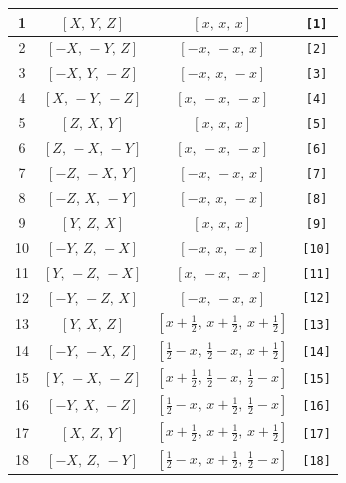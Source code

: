 \documentclass[fleqn,8pt]{jsarticle}
\begin{document}
\begin{longtable}{cccc}
1 & $\left[ X,\, Y,\, Z \right]$ & $\left[ x,\, x,\, x \right]$ & {\tt [1]} \\ \hline
2 & $\left[ - X,\, - Y,\, Z \right]$ & $\left[ - x,\, - x,\, x \right]$ & {\tt [2]} \\ \hline
3 & $\left[ - X,\, Y,\, - Z \right]$ & $\left[ - x,\, x,\, - x \right]$ & {\tt [3]} \\ \hline
4 & $\left[ X,\, - Y,\, - Z \right]$ & $\left[ x,\, - x,\, - x \right]$ & {\tt [4]} \\ \hline
5 & $\left[ Z,\, X,\, Y \right]$ & $\left[ x,\, x,\, x \right]$ & {\tt [5]} \\ \hline
6 & $\left[ Z,\, - X,\, - Y \right]$ & $\left[ x,\, - x,\, - x \right]$ & {\tt [6]} \\ \hline
7 & $\left[ - Z,\, - X,\, Y \right]$ & $\left[ - x,\, - x,\, x \right]$ & {\tt [7]} \\ \hline
8 & $\left[ - Z,\, X,\, - Y \right]$ & $\left[ - x,\, x,\, - x \right]$ & {\tt [8]} \\ \hline
9 & $\left[ Y,\, Z,\, X \right]$ & $\left[ x,\, x,\, x \right]$ & {\tt [9]} \\ \hline
10 & $\left[ - Y,\, Z,\, - X \right]$ & $\left[ - x,\, x,\, - x \right]$ & {\tt [10]} \\ \hline
11 & $\left[ Y,\, - Z,\, - X \right]$ & $\left[ x,\, - x,\, - x \right]$ & {\tt [11]} \\ \hline
12 & $\left[ - Y,\, - Z,\, X \right]$ & $\left[ - x,\, - x,\, x \right]$ & {\tt [12]} \\ \hline
13 & $\left[ Y,\, X,\, Z \right]$ & $\left[ x + \frac{1}{2},\, x + \frac{1}{2},\, x + \frac{1}{2} \right]$ & {\tt [13]} \\ \hline
14 & $\left[ - Y,\, - X,\, Z \right]$ & $\left[ \frac{1}{2} - x,\, \frac{1}{2} - x,\, x + \frac{1}{2} \right]$ & {\tt [14]} \\ \hline
15 & $\left[ Y,\, - X,\, - Z \right]$ & $\left[ x + \frac{1}{2},\, \frac{1}{2} - x,\, \frac{1}{2} - x \right]$ & {\tt [15]} \\ \hline
16 & $\left[ - Y,\, X,\, - Z \right]$ & $\left[ \frac{1}{2} - x,\, x + \frac{1}{2},\, \frac{1}{2} - x \right]$ & {\tt [16]} \\ \hline
17 & $\left[ X,\, Z,\, Y \right]$ & $\left[ x + \frac{1}{2},\, x + \frac{1}{2},\, x + \frac{1}{2} \right]$ & {\tt [17]} \\ \hline
18 & $\left[ - X,\, Z,\, - Y \right]$ & $\left[ \frac{1}{2} - x,\, x + \frac{1}{2},\, \frac{1}{2} - x \right]$ & {\tt [18]} \\ \hline

\end{longtable}
\end{document}
